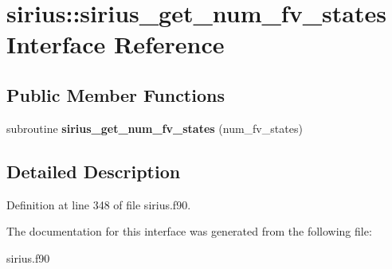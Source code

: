 \hypertarget{interfacesirius_1_1sirius__get__num__fv__states}{}\section{sirius\+:\+:sirius\+\_\+get\+\_\+num\+\_\+fv\+\_\+states Interface Reference}
\label{interfacesirius_1_1sirius__get__num__fv__states}
\subsection*{Public Member Functions}
\begin{DoxyCompactItemize}
\item 
\hypertarget{interfacesirius_1_1sirius__get__num__fv__states_a41607184f8dca91ea8c67b735efe17d1}{}subroutine {\bfseries sirius\+\_\+get\+\_\+num\+\_\+fv\+\_\+states} (num\+\_\+fv\+\_\+states)\label{interfacesirius_1_1sirius__get__num__fv__states_a41607184f8dca91ea8c67b735efe17d1}

\end{DoxyCompactItemize}


\subsection{Detailed Description}


Definition at line 348 of file sirius.\+f90.



The documentation for this interface was generated from the following file\+:\begin{DoxyCompactItemize}
\item 
sirius.\+f90\end{DoxyCompactItemize}
